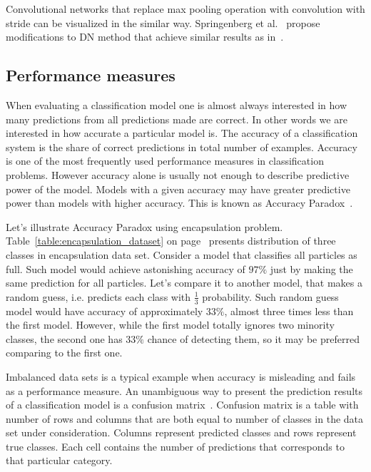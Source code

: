 \documentclass[a4paper, 11pt, table]{article}
\begin{document}
Convolutional networks that replace max pooling operation with convolution with stride can be visualized in the similar way. Springenberg et al.~\cite{DBLP:journals/corr/SpringenbergDBR14} propose modifications to DN method that achieve similar results as in~\cite{Zeiler2014}.

\subsection{Performance measures}

When evaluating a classification model one is almost always interested in how many predictions from all predictions made are correct. In other words we are interested in how accurate a particular model is. The accuracy of a classification system is the share of correct predictions in total number of examples. Accuracy  is one of the most frequently used performance measures in classification problems. However accuracy alone is usually not enough to describe predictive power of the model. Models with a given accuracy may have greater predictive power than models with higher accuracy. This is known as Accuracy Paradox~\cite{zhu2007knowledge}.

Let's illustrate Accuracy Paradox using encapsulation problem. Table~\ref{table:encapsulation_dataset} on page~\pageref{table:encapsulation_dataset} presents distribution of three classes in encapsulation data set. Consider a model that classifies all particles as full. Such model would achieve astonishing accuracy of $97\%$ just by making the same prediction for all particles. Let's compare it to another model, that makes a random guess, i.e. predicts each class with $\frac{1}{3}$ probability. Such random guess model would have accuracy of approximately $33\%$, almost three times less than the first model. However, while the first model totally ignores two minority classes, the second one has $33\%$ chance of detecting them, so it may be preferred comparing to the first one. 

Imbalanced data sets is a typical example when accuracy is misleading and fails as a performance measure. An unambiguous way to present the prediction results of a classification model is a confusion matrix~\cite{STEHMAN199777}. Confusion matrix is a table with number of rows and columns that are both equal to number of classes in the data set under consideration. Columns represent predicted classes and rows represent true classes. Each cell contains the number of predictions that corresponds to that particular category. 
\end{document}
